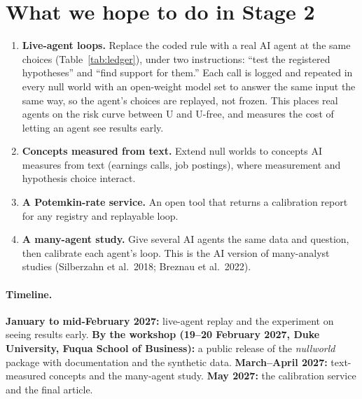 \documentclass[11pt]{article}
\begin{document}
\section*{What we hope to do in Stage 2}
\begin{enumerate}
\item \textbf{Live-agent loops.} Replace the coded rule with a real AI agent at the same choices (Table~\ref{tab:ledger}), under two
instructions: ``test the registered hypotheses'' and ``find support for
them.'' Each call is logged and repeated in every null world with an open-weight model set to answer the same input the
same way, so the agent's choices are replayed, not frozen. This places real agents on the risk curve between U and
U-free, and measures the cost of letting an agent see results early.
\item \textbf{Concepts measured from text.} Extend null worlds to concepts AI measures from text (earnings calls, job
postings), where measurement and hypothesis choice interact.
\item \textbf{A Potemkin-rate service.} An open tool that returns a calibration report for any registry and replayable loop.
\item \textbf{A many-agent study.} Give several AI agents the same data and question, then calibrate each agent's loop. This
is the AI version of many-analyst studies (Silberzahn et al.\ 2018; Breznau et al.\ 2022).
\end{enumerate}

\paragraph{Timeline.} \textbf{January to mid-February 2027:} live-agent replay and the experiment on seeing results
early. \textbf{By the workshop (19--20 February 2027, Duke University, Fuqua School of Business):} a public release of
the \emph{nullworld} package with documentation and the synthetic data. \textbf{March--April 2027:} text-measured concepts and the
many-agent study. \textbf{May 2027:} the calibration service and the final article.
\end{document}
